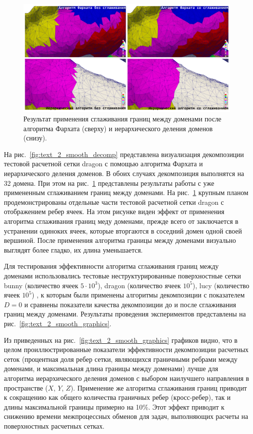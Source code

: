 \begin{figure}[!ht]
\centering
\includegraphics[width=1.0\textwidth]{fig/par_dragon_decomp2.pdf}
\singlespacing
{}\caption{Результат применения сглаживания границ между доменами после алгоритма Фархата (сверху) и иерархического деления доменов (снизу).}
\label{fig:text_2_smooth_decomp2}
\end{figure}

На рис.~\ref{fig:text_2_smooth_decomp} представлена визуализация декомпозиции тестовой расчетной сетки dragon \cite{StanfordModels} с помощью алгоритма Фархата и иерархического деления доменов.
В обоих случаях декомпозиция выполнятся на 32 домена.
При этом на рис.~\ref{fig:text_2_smooth_decomp2} представлены результаты работы с уже примененным сглаживанием границ между доменами.
На рис.~\ref{fig:text_2_smooth_decomp2} крупным планом продемонстрированы отдельные части тестовой расчетной сетки dragon с отображением ребер ячеек.
На этом рисунке виден эффект от применения алгоритма сглаживания границ меду доменами, прежде всего от заключается в устранении одиноких ячеек, которые вторгаются в соседний домен одной своей вершиной.
После применения алгоритма границы между доменами визуально выглядят более гладко, их длина уменьшается.

Для тестирования эффективности алгоритма сглаживания границ между доменами использовались тестовые неструктурированные поверхностные сетки bunny (количество ячеек $5 \cdot 10^3$), dragon (количество ячеек $10^5$), lucy (количество ячеек $10^5$) \cite{StanfordModels}, к которым были применены алгоритмы декомпозиции с показателем $D = 0$ и сравнены показатели качества декомпозиции до и после сглаживания границ между доменами.
Результаты проведения экспериментов представлены на рис.~\ref{fig:text_2_smooth_graphics}.

Из приведенных на рис.~\ref{fig:text_2_smooth_graphics} графиков видно, что в целом проиллюстрированные показатели эффективности декомпозиции расчетных сеток (процентная доля ребер сетки, являющихся граничными ребрами между доменами, и максимальная длина границы между доменами) лучше для алгоритма иерархического деления доменов с выбором наилучшего направления в пространстве ($X$, $Y$, $Z$).
Применение же алгоритма сглаживания границ приводит к сокращению как общего количества граничных ребер (кросс-ребер), так и длины максимальной границы примерно на 10\%.
Этот эффект приводит к снижению времени межпроцессных обменов для задач, выполняющих расчеты на поверхностных расчетных сетках.

